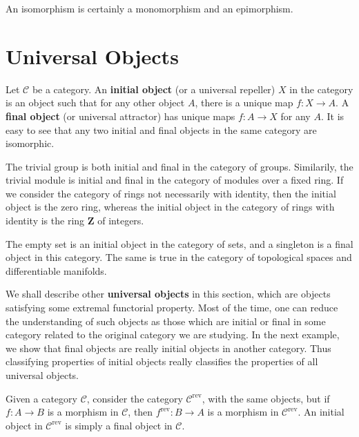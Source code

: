 An isomorphism is certainly a monomorphism and an epimorphism.

\section{Universal Objects}

Let $\mathcal{C}$ be a category. An {\bf initial object} (or a universal repeller) $X$ in the category is an object such that for any other object $A$, there is a unique map $f: X \to A$. A {\bf final object} (or universal attractor) has unique maps $f: A \to X$ for any $A$. It is easy to see that any two initial and final objects in the same category are isomorphic.

\begin{example}
    The trivial group is both initial and final in the category of groups. Similarily, the trivial module is initial and final in the category of modules over a fixed ring. If we consider the category of rings not necessarily with identity, then the initial object is the zero ring, whereas the initial object in the category of rings with identity is the ring $\mathbf{Z}$ of integers.
\end{example}

\begin{example}
    The empty set is an initial object in the category of sets, and a singleton is a final object in this category. The same is true in the category of topological spaces and differentiable manifolds.
\end{example}

We shall describe other {\bf universal objects} in this section, which are objects satisfying some extremal functorial property. Most of the time, one can reduce the understanding of such objects as those which are initial or final in some category related to the original category we are studying. In the next example, we show that final objects are really initial objects in another category. Thus classifying properties of initial objects really classifies the properties of all universal objects.

\begin{example}
    Given a category $\mathcal{C}$, consider the category $\mathcal{C}^{\text{rev}}$, with the same objects, but if $f: A \to B$ is a morphism in $\mathcal{C}$, then $f^{\text{rev}}: B \to A$ is a morphism in $\mathcal{C}^{\text{rev}}$. An initial object in $\mathcal{C}^{\text{rev}}$ is simply a final object in $\mathcal{C}$.
\end{example}

